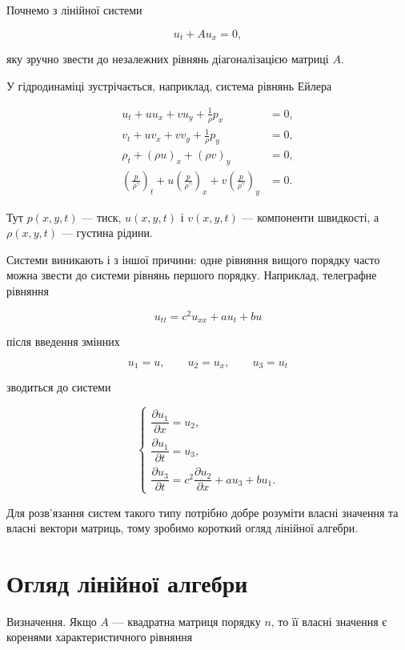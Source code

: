 \documentclass[
  ukrainian,
]{article}
\begin{document}
Почнемо з лінійної системи

\[
u_t + A u_x = 0,
\]

яку зручно звести до незалежних рівнянь діагоналізацією матриці \(A\).

У гідродинаміці зустрічається, наприклад, система рівнянь Ейлера

\[
\begin{aligned}
u_t + uu_x + vu_y + \frac{1}{\rho}p_x &= 0,\\
v_t + uv_x + vv_y + \frac{1}{\rho}p_y &= 0,\\
\rho_t + (\rho u)_x + (\rho v)_y &= 0,\\
\left(\frac{p}{\rho^\gamma}\right)_t
+ u\left(\frac{p}{\rho^\gamma}\right)_x
+ v\left(\frac{p}{\rho^\gamma}\right)_y &= 0.
\end{aligned}
\]

Тут \(p(x,y,t)\) --- тиск, \(u(x,y,t)\) і \(v(x,y,t)\) --- компоненти
швидкості, а \(\rho(x,y,t)\) --- густина рідини.

Системи виникають і з іншої причини: одне рівняння вищого порядку часто
можна звести до системи рівнянь першого порядку. Наприклад, телеграфне
рівняння

\[
u_{tt} = c^2 u_{xx} + a u_t + b u
\]

після введення змінних

\[
u_1=u,\qquad u_2=u_x,\qquad u_3=u_t
\]

зводиться до системи

\[
\begin{cases}
\dfrac{\partial u_1}{\partial x} = u_2,\\[4pt]
\dfrac{\partial u_1}{\partial t} = u_3,\\[4pt]
\dfrac{\partial u_3}{\partial t} = c^2 \dfrac{\partial u_2}{\partial x} + a u_3 + b u_1.
\end{cases}
\]

Для розв'язання систем такого типу потрібно добре розуміти власні
значення та власні вектори матриць, тому зробимо короткий огляд лінійної
алгебри.

\section{Огляд лінійної
алгебри}\label{ux43eux433ux43bux44fux434-ux43bux456ux43dux456ux439ux43dux43eux457-ux430ux43bux433ux435ux431ux440ux438}

Визначення. Якщо \(A\) --- квадратна матриця порядку \(n\), то її власні
значення є коренями характеристичного рівняння
\end{document}
